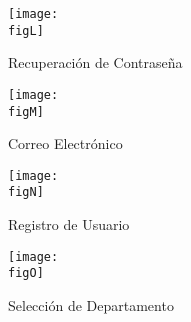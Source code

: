 \begin{figure}[h]
	\centering
	\texttt{[image: \\figL]}
	\caption{Recuperación de Contraseña}
\end{figure}

\begin{figure}[h]
	\centering
	\texttt{[image: \\figM]}
	\caption{Correo Electrónico}
\end{figure}

\begin{figure}[h]
	\centering
	\texttt{[image: \\figN]}
	\caption{Registro de Usuario}
\end{figure}

\begin{figure}[h]
	\centering
	\texttt{[image: \\figO]}
	\caption{Selección de Departamento}
\end{figure}

